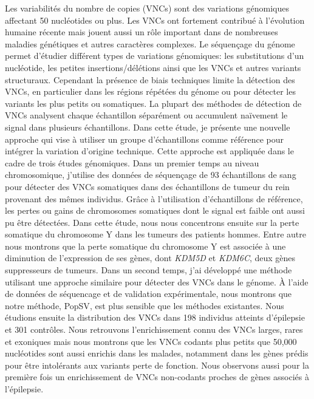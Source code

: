 Les variabilités du nombre de copies (VNCs) sont des variations génomiques affectant 50 nucléotides ou plus.
Les VNCs ont fortement contribué \`a l'évolution humaine récente mais jouent aussi un rôle important dans de nombreuses maladies génétiques et autres caractères complexes.
Le séquen\c{c}age du génome permet d'étudier différent types de variations génomiques: les substitutions d'un nucléotide, les petites insertions/délétions ainsi que les VNCs et autres variants structuraux.
Cependant la présence de biais techniques limite la détection des VNCs, en particulier dans les régions répétées du génome ou pour détecter les variants les plus petits ou somatiques.
La plupart des méthodes de détection de VNCs analysent chaque échantillon séparément ou accumulent naïvement le signal dans plusieurs échantillons.
Dans cette étude, je présente une nouvelle approche qui vise \`a utiliser un groupe d'échantillons comme référence pour intégrer la variation d'origine technique.
Cette approche est appliquée dans le cadre de trois études génomiques.
Dans un premier temps au niveau chromosomique, j'utilise des données de séquen\c{c}age de 93 échantillons de sang pour détecter des VNCs somatiques dans des échantillons de tumeur du rein provenant des m\^emes individus.
Gr\^ace \`a l'utilisation d'échantillons de référence, les pertes ou gains de chromosomes somatiques dont le signal est faible ont aussi pu être détectées.
Dans cette étude, nous nous concentrons ensuite sur la perte somatique du chromosome Y dans les tumeurs des patients hommes.
Entre autre nous montrons que la perte somatique du chromosome Y est associée \`a une diminution de l'expression de ses gènes, dont {\it KDM5D} et {\it KDM6C}, deux gènes suppresseurs de tumeurs.
Dans un second temps, j'ai développé une méthode utilisant une approche similaire pour détecter des VNCs dans le génome.
\`A l'aide de données de séquencage et de validation expérimentale, nous montrons que notre méthode, {\sf PopSV}, est plus sensible que les méthodes existantes.
Nous étudions ensuite la distribution des VNCs dans 198 individus atteints d'épilepsie et 301 contr\^oles.
Nous retrouvons l'enrichissement connu des VNCs larges, rares et exoniques mais nous montrons que les VNCs codants plus petits que 50,000 nucléotides sont aussi enrichis dans les malades, notamment dans les gènes prédis pour \^etre intolérants aux variants perte de fonction.
Nous observons aussi pour la première fois un enrichissement de VNCs non-codants proches de gènes associés \`a l'épilepsie.
